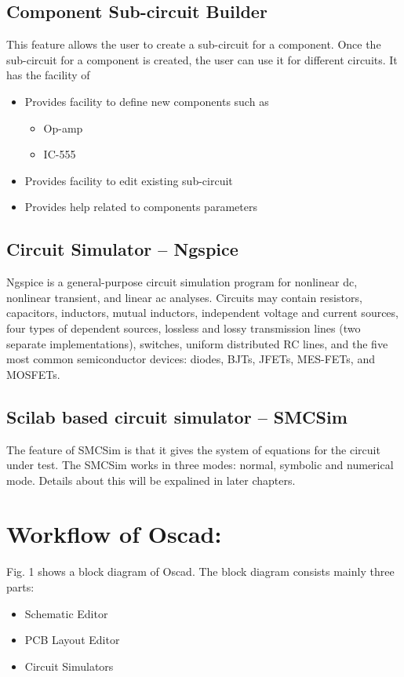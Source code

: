 \subsection{Component Sub-circuit Builder}
This feature allows the user to create a sub-circuit for a component. Once the sub-circuit for a component is created, the user can use it
for different circuits. It has the facility of 
\begin{itemize}
\item Provides facility to define new components such as
\begin{itemize}
\item Op-amp
\item IC-555
\end{itemize}
\item Provides facility to edit existing sub-circuit
\item Provides help related to components parameters
\end{itemize}

\subsection{Circuit Simulator -- Ngspice}
Ngspice is a general-purpose circuit simulation program for nonlinear dc, nonlinear transient, and linear ac analyses. Circuits may contain resistors, capacitors, inductors, mutual inductors, independent voltage and current sources, four types of dependent sources, lossless and lossy transmission lines (two separate implementations), switches, uniform distributed RC lines, and the five most common semiconductor devices: diodes, BJTs, JFETs, MES-FETs, and MOSFETs.
\subsection{Scilab based circuit simulator -- SMCSim}

The feature of SMCSim is that it gives the system of equations for the circuit under test. The SMCSim works in three modes: normal, symbolic and numerical mode. Details about this will be expalined in later chapters.

\section {Workflow of Oscad:}
Fig. 1 shows a block diagram of Oscad. The block diagram consists mainly three parts: 
\begin{itemize}
\item Schematic Editor 
\item PCB Layout Editor  
\item Circuit Simulators
\end{itemize} 


